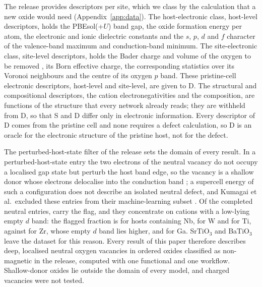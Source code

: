 The release provides \numDescriptorProvenanceNDescriptorColumns{} descriptors per site, which we class by the calculation that a new oxide would need (Appendix~\ref{app:data}). The host-electronic class, \numNetDescriptorsHost{} host-level descriptors, holds the PBEsol(+$U$) band gap, the oxide formation energy per atom, the electronic and ionic dielectric constants and the $s$, $p$, $d$ and $f$ character of the valence-band maximum and conduction-band minimum. The site-electronic class, \numNetDescriptorsSite{} site-level descriptors, holds the Bader charge and volume of the oxygen to be removed \citep{Henkelman2006fast}, its Born effective charge, the corresponding statistics over its Voronoi neighbours and the centre of its oxygen $p$ band. These \numRfElectronicNFeatures{} pristine-cell electronic descriptors, \numNetDescriptorsHost{} host-level and \numNetDescriptorsSite{} site-level, are given to D. The \numRfStructuralNFeatures{} structural and compositional descriptors, the cation electronegativities and the composition, are functions of the structure that every network already reads; they are withheld from D, so that S and D differ only in electronic information. Every descriptor of D comes from the pristine cell and none requires a defect calculation, so D is an oracle for the electronic structure of the pristine host, not for the defect.

The perturbed-host-state filter of the release sets the domain of every result. In a perturbed-host-state entry the two electrons of the neutral vacancy do not occupy a localised gap state but perturb the host band edge, so the vacancy is a shallow donor whose electrons delocalise into the conduction band \citep{Lany2005anion,Zhang2006systematic}; a supercell energy of such a configuration does not describe an isolated neutral defect, and Kumagai et al.\ excluded these entries from their machine-learning subset \citep{Kumagai2021insights}. Of the \numScreeningAbsenceReleaseNeutralCompletedEntries{} completed neutral entries, \numScreeningAbsenceReleaseNeutralCompletedPhs{} carry the flag, and they concentrate on \dzero{} cations with a low-lying empty $d$ band: the flagged fraction is \numScreeningAbsencePhsByCationNbPhsRateWith{} for hosts containing Nb, \numScreeningAbsencePhsByCationWPhsRateWith{} for W and \numScreeningAbsencePhsByCationTiPhsRateWith{} for Ti, against \numScreeningAbsencePhsByCationZrPhsRateWith{} for Zr, whose empty $d$ band lies higher, and \numScreeningAbsencePhsByCationGaPhsRateWith{} for Ga. SrTiO$_3$ and BaTiO$_3$ leave the dataset for this reason. Every result of this paper therefore describes deep, localised neutral oxygen vacancies in ordered oxides classified as non-magnetic in the release, computed with one functional and one workflow. Shallow-donor oxides lie outside the domain of every model, and charged vacancies were not tested.
